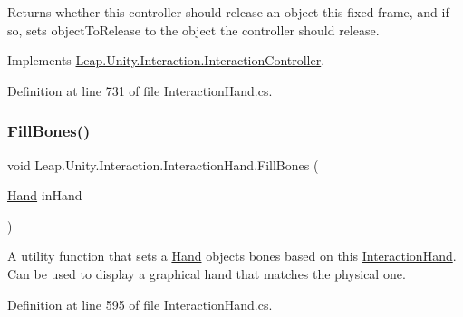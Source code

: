 Returns whether this controller should release an object this fixed frame, and if so, sets object\+To\+Release to the object the controller should release. 



Implements \mbox{\hyperlink{class_leap_1_1_unity_1_1_interaction_1_1_interaction_controller_ac2f99423db66dad0d889723c6acff62f}{Leap.\+Unity.\+Interaction.\+Interaction\+Controller}}.



Definition at line 731 of file Interaction\+Hand.\+cs.

\mbox{\label{class_leap_1_1_unity_1_1_interaction_1_1_interaction_hand_a39457043d21af87fcbcf45c8c0876b1e}} 
\subsubsection{\texorpdfstring{FillBones()}{FillBones()}}
{\footnotesize\ttfamily void Leap.\+Unity.\+Interaction.\+Interaction\+Hand.\+Fill\+Bones (\begin{DoxyParamCaption}\item[{\mbox{\hyperlink{class_leap_1_1_hand}{Hand}}}]{in\+Hand }\end{DoxyParamCaption})}



A utility function that sets a \mbox{\hyperlink{class_leap_1_1_hand}{Hand}} object\textquotesingle{}s bones based on this \mbox{\hyperlink{class_leap_1_1_unity_1_1_interaction_1_1_interaction_hand}{Interaction\+Hand}}. Can be used to display a graphical hand that matches the physical one. 



Definition at line 595 of file Interaction\+Hand.\+cs.

\mbox{\label{class_leap_1_1_unity_1_1_interaction_1_1_interaction_hand_ae6c2849268e677588ab571707d5aec5b}} 
